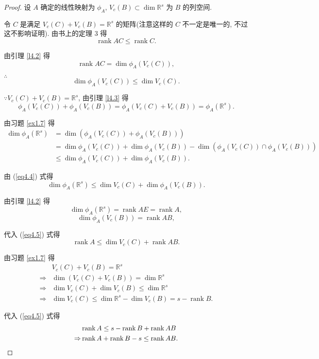 \documentclass{ctexart}
\begin{document}
\begin{proof}
    设 $A$ 确定的线性映射为 $\phi_A$, $V_c(B)\subset\dim\mathbb{R}^s$ 为 $B$ 的列空间.

    令 $C$ 是满足 $V_c(C)+V_c(B)=\mathbb{R}^s$ 的矩阵(注意这样的 $C$ 不一定是唯一的, 不过这不影响证明). 由书上的定理 3 得
    \[\operatorname{rank}AC\leq\operatorname{rank}C.\]

    由引理 \ref{l4.2} 得
    \[\operatorname{rank}AC=\dim\phi_A(V_c(C)),\]

    $\therefore$
    \begin{equation}\label{eq4.4}
        \dim\phi_A(V_c(C))\leq\dim V_c(C).
    \end{equation}

    $\because V_c(C)+V_c(B)=\mathbb{R}^s$, 由引理 \ref{l4.3} 得
    \[\phi_A(V_c(C))+\phi_A(V_c(B))=\phi_A(V_c(C)+V_c(B))=\phi_A(\mathbb{R}^s).\]

    由习题 \ref{ex1.7} 得
    \begin{align*}
        \dim\phi_A(\mathbb{R}^s) & =\dim(\phi_A(V_c(C))+\phi_A(V_c(B))) \\
        & =\dim\phi_A(V_c(C))+\dim\phi_A(V_c(B))-\dim(\phi_A(V_c(C))\cap\phi_A(V_c(B))) \\
        & \leq\dim\phi_A(V_c(C))+\dim\phi_A(V_c(B)).
    \end{align*}

    由 (\ref{eq4.4}) 式得
    \begin{equation}\label{eq4.5}
        \dim\phi_A(\mathbb{R}^s)\leq\dim V_c(C)+\dim\phi_A(V_c(B)).
    \end{equation}

    由引理 \ref{l4.2} 得
    \[\dim\phi_A(\mathbb{R}^s)=\operatorname{rank}AE=\operatorname{rank}A,\]
    \[\dim\phi_A(V_c(B))=\operatorname{rank}AB,\]

    代入 (\ref{eq4.5}) 式得
    \begin{equation}
        \operatorname{rank}A\leq\dim V_c(C)+\operatorname{rank}AB.
    \end{equation}

    由习题 \ref{ex1.7} 得
    \begin{align*}
        & V_c(C)+V_c(B)=\mathbb{R}^s \\
        \Rightarrow & \dim (V_c(C)+V_c(B))=\dim\mathbb{R}^s \\
        \Rightarrow & \dim V_c(C)+\dim V_c(B)\leq\dim\mathbb{R}^s \\
        \Rightarrow & \dim V_c(C)\leq\dim\mathbb{R}^s-\dim V_c(B)=s-\operatorname{rank}B.
    \end{align*}

    代入 (\ref{eq4.5}) 式得
    \begin{align*}
        & \operatorname{rank}A\leq s-\operatorname{rank}B+\operatorname{rank}AB \\
        \Rightarrow & \operatorname{rank}A+\operatorname{rank}B-s\leq\operatorname{rank}AB.\qedhere
    \end{align*}
\end{proof}
\end{document}
